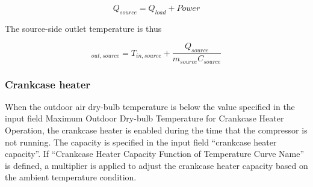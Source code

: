 \begin{equation}
Q_{source} = Q_{load} + Power 
\end{equation}

The source-side outlet temperature is thus

\begin{equation}
_{out,source} = T_{in,source} + \frac{Q_{source}}{m_{source}C_{source}} 
\end{equation}

\subsubsection{Crankcase heater}

When the outdoor air dry-bulb temperature is below the value specified in the
input field Maximum Outdoor Dry-bulb Temperature for Crankcase Heater Operation,
the crankcase heater is enabled during the time that the compressor is not
running. The capacity is specified in the input field ``crankcase heater
capacity''. If ``Crankcase Heater Capacity Function of Temperature Curve Name'' is
defined, a multiplier is applied to adjust the crankcase heater capacity based
on the ambient temperature condition.